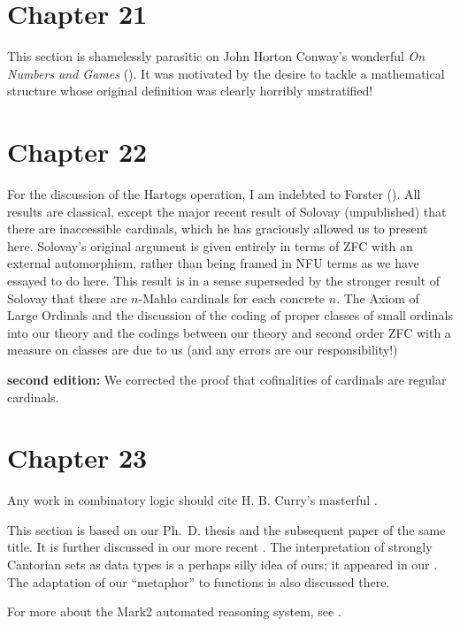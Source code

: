 \section*{Chapter 21}

This section is shamelessly parasitic on John Horton Conway's
wonderful {\itshape On Numbers and Games\/} (\cite{conway}).  It was
motivated by the desire to tackle a mathematical structure whose
original definition was clearly horribly unstratified!



\section*{Chapter 22}

For the discussion of the Hartogs operation, I am indebted to Forster
(\cite{forster}).  All results are classical, except the major recent
result of Solovay (unpublished) that there are
inaccessible cardinals, which he has graciously allowed us to present here.
Solovay's original argument is given entirely in terms of ZFC
with an external automorphism, rather than being framed in NFU
terms as we have essayed to do here.  This result is in a sense superseded
by the stronger result of Solovay that there are $n$-Mahlo cardinals
for each concrete $n$.  The Axiom of Large Ordinals and the discussion of the coding of proper classes of small
ordinals into our theory and the codings between our theory and second
order ZFC with a measure on
classes are due to us (and any errors are our responsibility!)

{\bf second edition:}  We corrected the proof that cofinalities of cardinals are regular cardinals.



\section*{Chapter 23}

Any work in combinatory logic should cite H. B. Curry's masterful
\cite{curry}.

This section is based on our Ph.~D. thesis \cite{thesis} and the
subsequent paper \cite{thesispaper} of the same title.  It is further
discussed in our more recent \cite{stratification}.  The
interpretation of strongly Cantorian sets as
data types is a perhaps silly idea of ours; it appeared in our
\cite{modernlogic}.  The adaptation of our ``metaphor'' to
functions is also discussed there.

For more about the Mark2 automated reasoning system, see \cite{rewrite}.
